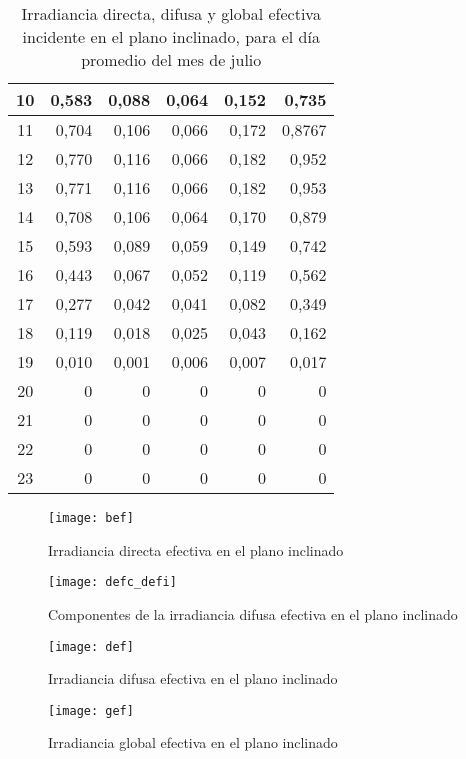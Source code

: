 \begin{table}[H]
\begin{tabular}{|c|r|r|r|r|r|}
10 & 0,583 & 0,088 & 0,064 & 0,152 & 0,735    \\ \hline
11 & 0,704 & 0,106 & 0,066 & 0,172 & 0,8767   \\ \hline
12 & 0,770 & 0,116 & 0,066 & 0,182 & 0,952    \\ \hline
13 & 0,771 & 0,116 & 0,066 & 0,182 & 0,953    \\ \hline
14 & 0,708 & 0,106 & 0,064 & 0,170 & 0,879    \\ \hline
15 & 0,593 & 0,089 & 0,059 & 0,149 & 0,742    \\ \hline
16 & 0,443 & 0,067 & 0,052 & 0,119 & 0,562    \\ \hline
17 & 0,277 & 0,042 & 0,041 & 0,082 & 0,349    \\ \hline
18  & 0,119 & 0,018 & 0,025 & 0,043 & 0,162    \\ \hline
19  & 0,010 & 0,001 & 0,006 & 0,007 & 0,017    \\ \hline
20  & 0     & 0     & 0     & 0     & 0        \\ \hline
21  & 0     & 0     & 0     & 0     & 0        \\ \hline
22  & 0     & 0     & 0     & 0     & 0        \\ \hline
23  & 0     & 0     & 0     & 0     & 0        \\ \hline
\end{tabular}
\caption{Irradiancia  directa, difusa y global efectiva incidente en el plano inclinado, para el día promedio del mes de julio \label{tab:hourly_tilted_ef_values}}
\end{table}

\begin{figure}[H]
\texttt{[image: bef]}
\centering
\caption{Irradiancia directa efectiva en el plano inclinado}
\label{fig:hourly_bef}
\end{figure}

\begin{figure}[H]
\texttt{[image: defc\_defi]}
\centering
\caption{Componentes de la irradiancia difusa efectiva en el plano inclinado}
\label{fig:hourly_defc_defi}
\end{figure}

\begin{figure}[H]
\texttt{[image: def]}
\centering
\caption{Irradiancia difusa efectiva en el plano inclinado}
\label{fig:hourly_def}
\end{figure}

\begin{figure}[H]
\texttt{[image: gef]}
\centering
\caption{Irradiancia global efectiva en el plano inclinado}
\label{fig:hourly_gef}
\end{figure}

